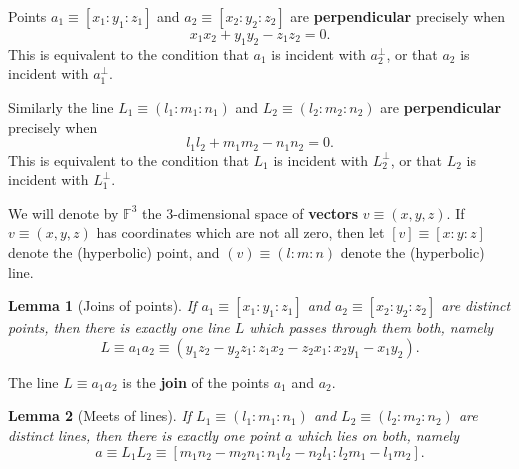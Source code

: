 \documentclass[11pt]{article}
\newtheorem{theorem}{Theorem}
\newtheorem{theorem}{Lemma}
\begin{document}
Points $a_{1}\equiv[x_{1}:y_{1}:z_{1}]$ and $a_{2}\equiv[x_{2}:y_{2}:z_{2}]$
are \textbf{perpendicular} precisely when 
\begin{equation*}
x_{1}x_{2}+y_{1}y_{2}-z_{1}z_{2}=0.
\end{equation*}
This is equivalent to the condition that $a_{1}$ is incident with $%
a_{2}^{\perp}$, or that $a_{2}$ is incident with $a_{1}^{\perp}$.\newline

Similarly the line $L_{1}\equiv(l_{1}:m_{1}:n_{1})$ and $L_{2}%
\equiv(l_{2}:m_{2}:n_{2})$ are \textbf{perpendicular} precisely when 
\begin{equation*}
l_{1}l_{2}+m_{1}m_{2}-n_{1}n_{2}=0.
\end{equation*}
This is equivalent to the condition that $L_{1}$ is incident with $%
L_{2}^{\perp}$, or that $L_{2}$ is incident with $L_{1}^{\perp}$.\newline

We will denote by $\mathbb{F}^{3}$ the 3-dimensional space of \textbf{vectors%
} $v\equiv(x,y,z)$. If $v\equiv(x,y,z)$ has coordinates which are not all
zero, then let $[v]\equiv[x:y:z]$ denote the (hyperbolic) point, and $%
(v)\equiv(l:m:n)$ denote the (hyperbolic) line.\newline

\begin{theorem}[Joins of points]
If $a_{1}\equiv[x_{1}:y_{1}:z_{1}]$ and $a_{2}\equiv[x_{2}:y_{2}:z_{2}]$ are
distinct points, then there is exactly one line $L$ which passes through
them both, namely 
\begin{equation*}
L\equiv
a_{1}a_{2}%
\equiv(y_{1}z_{2}-y_{2}z_{1}:z_{1}x_{2}-z_{2}x_{1}:x_{2}y_{1}-x_{1}y_{2}).
\end{equation*}
\end{theorem}

The line $L\equiv a_{1}a_{2}$ is the \textbf{join} of the points $a_{1}$ and 
$a_{2}$.\newline

\begin{theorem}[Meets of lines]
If $L_{1}\equiv(l_{1}:m_{1}:n_{1})$ and $L_{2}\equiv(l_{2}:m_{2}:n_{2})$ are
distinct lines, then there is exactly one point $a$ which lies on both,
namely 
\begin{equation*}
a\equiv L_{1}L_{2}\equiv[%
m_{1}n_{2}-m_{2}n_{1}:n_{1}l_{2}-n_{2}l_{1}:l_{2}m_{1}-l_{1}m_{2}].
\end{equation*}
\end{theorem}
\end{document}
